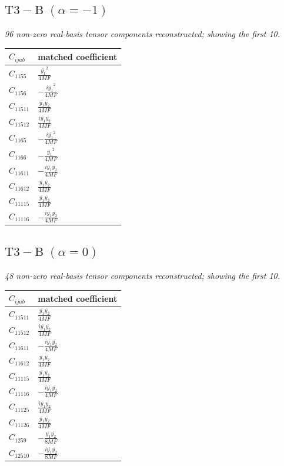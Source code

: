 \documentclass[9pt]{article}
\begin{document}
\subsection*{$ \mathrm{T3-B}\;(\alpha=-1) $}
\textit{96 non-zero real-basis tensor components reconstructed; showing the first 10.}
\begin{longtable}{@{}ll@{}}
\toprule
$C_{ijab}$ & matched coefficient \\
\midrule
$C_{1155}$ & $ \frac{\overline{y_{1}}^{2}}{4 MF} $ \\
$C_{1156}$ & $ - \frac{i \overline{y_{1}}^{2}}{4 MF} $ \\
$C_{11511}$ & $ \frac{\overline{y_{1}} \overline{y_{2}}}{4 MF} $ \\
$C_{11512}$ & $ \frac{i \overline{y_{1}} \overline{y_{2}}}{4 MF} $ \\
$C_{1165}$ & $ - \frac{i \overline{y_{1}}^{2}}{4 MF} $ \\
$C_{1166}$ & $ - \frac{\overline{y_{1}}^{2}}{4 MF} $ \\
$C_{11611}$ & $ - \frac{i \overline{y_{1}} \overline{y_{2}}}{4 MF} $ \\
$C_{11612}$ & $ \frac{\overline{y_{1}} \overline{y_{2}}}{4 MF} $ \\
$C_{11115}$ & $ \frac{\overline{y_{1}} \overline{y_{2}}}{4 MF} $ \\
$C_{11116}$ & $ - \frac{i \overline{y_{1}} \overline{y_{2}}}{4 MF} $ \\
\bottomrule
\end{longtable}
\subsection*{$ \mathrm{T3-B}\;(\alpha=0) $}
\textit{48 non-zero real-basis tensor components reconstructed; showing the first 10.}
\begin{longtable}{@{}ll@{}}
\toprule
$C_{ijab}$ & matched coefficient \\
\midrule
$C_{11511}$ & $ \frac{\overline{y_{1}} \overline{y_{2}}}{4 MF} $ \\
$C_{11512}$ & $ \frac{i \overline{y_{1}} \overline{y_{2}}}{4 MF} $ \\
$C_{11611}$ & $ - \frac{i \overline{y_{1}} \overline{y_{2}}}{4 MF} $ \\
$C_{11612}$ & $ \frac{\overline{y_{1}} \overline{y_{2}}}{4 MF} $ \\
$C_{11115}$ & $ \frac{\overline{y_{1}} \overline{y_{2}}}{4 MF} $ \\
$C_{11116}$ & $ - \frac{i \overline{y_{1}} \overline{y_{2}}}{4 MF} $ \\
$C_{11125}$ & $ \frac{i \overline{y_{1}} \overline{y_{2}}}{4 MF} $ \\
$C_{11126}$ & $ \frac{\overline{y_{1}} \overline{y_{2}}}{4 MF} $ \\
$C_{1259}$ & $ - \frac{\overline{y_{1}} \overline{y_{2}}}{8 MF} $ \\
$C_{12510}$ & $ - \frac{i \overline{y_{1}} \overline{y_{2}}}{8 MF} $ \\
\bottomrule
\end{longtable}
\end{document}
